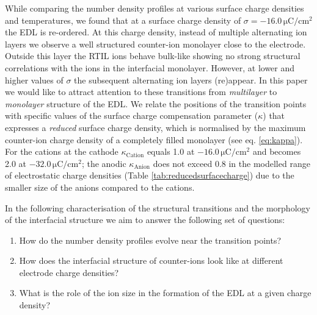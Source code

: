 \documentclass[final,5p,times,twocolumn]{elsarticle}
\begin{document}
While comparing the number density profiles at various surface charge densities and temperatures, we found that at a surface charge density of $\sigma=-16.0\,\mathrm{\mu C/cm^2}$ the EDL is re-ordered. At this charge density, instead of multiple alternating ion layers we observe a well structured counter-ion monolayer close to the electrode. Outside this layer the RTIL ions behave bulk-like showing no strong structural correlations with the ions in the interfacial monolayer. However, at lower and higher values of $\sigma$ the subsequent alternating ion layers (re)appear. In this paper we would like to attract attention to these transitions from \emph{multilayer} to \emph{monolayer} structure of the EDL. We relate the positions of the transition points with specific values of the surface charge compensation parameter ($\kappa$) that expresses a \textit{reduced} surface charge density, which is normalised by the maximum counter-ion charge density of a completely filled monolayer (see eq. \ref{eq:kappa}). For the cations at the cathode $\kappa_{\mathrm{Cation}}$ equals 1.0 at $-16.0\,\mathrm{\mu C/cm^2}$ and becomes 2.0 at $-32.0\,\mathrm{\mu C/cm^2}$;  the anodic $\kappa_{\mathrm{Anion}}$ does not exceed 0.8 in the modelled range of electrostatic charge densities (Table \ref{tab:reducedsurfacecharge}) due to the smaller size of the anions compared to the cations.

In the following characterisation of the structural transitions and the morphology of the interfacial structure we aim to answer the following set of questions:
\begin{enumerate}
 \item How do the number density profiles evolve near the transition points?
 \item How does the interfacial structure of counter-ions look like at different electrode charge densities? 
 \item What is the role of the ion size in the formation of the EDL at a given charge density?
\end{enumerate}
\end{document}
